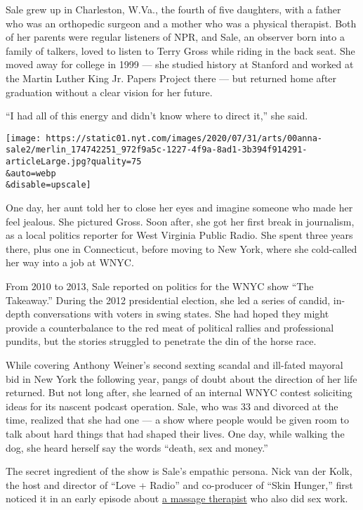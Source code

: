 Sale grew up in Charleston, W.Va., the fourth of five daughters, with a
father who was an orthopedic surgeon and a mother who was a physical
therapist. Both of her parents were regular listeners of NPR, and Sale,
an observer born into a family of talkers, loved to listen to Terry
Gross while riding in the back seat. She moved away for college in 1999
--- she studied history at Stanford and worked at the Martin Luther King
Jr. Papers Project there --- but returned home after graduation without
a clear vision for her future.

``I had all of this energy and didn't know where to direct it,'' she
said.

\texttt{[image: https://static01.nyt.com/images/2020/07/31/arts/00anna-sale2/merlin\_174742251\_972f9a5c-1227-4f9a-8ad1-3b394f914291-articleLarge.jpg?quality=75\\\&auto=webp\\\&disable=upscale]}

One day, her aunt told her to close her eyes and imagine someone who
made her feel jealous. She pictured Gross. Soon after, she got her first
break in journalism, as a local politics reporter for West Virginia
Public Radio. She spent three years there, plus one in Connecticut,
before moving to New York, where she cold-called her way into a job at
WNYC.

From 2010 to 2013, Sale reported on politics for the WNYC show ``The
Takeaway.'' During the 2012 presidential election, she led a series of
candid, in-depth conversations with voters in swing states. She had
hoped they might provide a counterbalance to the red meat of political
rallies and professional pundits, but the stories struggled to penetrate
the din of the horse race.

While covering Anthony Weiner's second sexting scandal and ill-fated
mayoral bid in New York the following year, pangs of doubt about the
direction of her life returned. But not long after, she learned of an
internal WNYC contest soliciting ideas for its nascent podcast
operation. Sale, who was 33 and divorced at the time, realized that she
had one --- a show where people would be given room to talk about hard
things that had shaped their lives. One day, while walking the dog, she
heard herself say the words ``death, sex and money.''

The secret ingredient of the show is Sale's empathic persona. Nick van
der Kolk, the host and director of ``Love + Radio'' and co-producer of
``Skin Hunger,'' first noticed it in an early episode about
\href{https://www.wnycstudios.org/podcasts/deathsexmoney/episodes/sex-worker-next-door}{a
massage therapist} who also did sex work.

